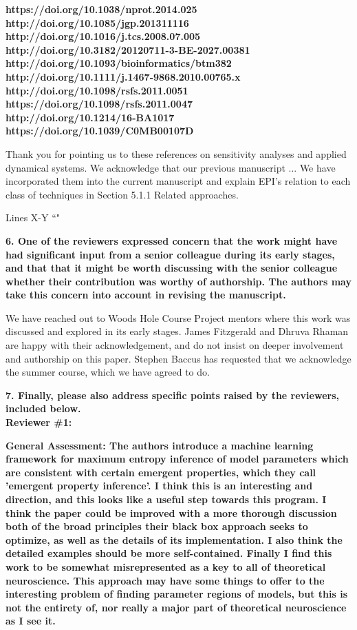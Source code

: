 \documentclass[11pt,a4paper]{article}
\begin{document}
\textbf{https://doi.org/10.1038/nprot.2014.025 \\
http://doi.org/10.1085/jgp.201311116 \\
http://doi.org/10.1016/j.tcs.2008.07.005 \\
http://doi.org/10.3182/20120711-3-BE-2027.00381 \\
http://doi.org/10.1093/bioinformatics/btm382 \\
http://doi.org/10.1111/j.1467-9868.2010.00765.x \\
http://doi.org/10.1098/rsfs.2011.0051 \\
https://doi.org/10.1098/rsfs.2011.0047 \\
http://doi.org/10.1214/16-BA1017 \\
https://doi.org/10.1039/C0MB00107D}

Thank you for pointing us to these references on sensitivity analyses and applied dynamical systems.  
We acknowledge that our previous manuscript ...
We have incorporated them into the current manuscript and explain EPI’s relation to each class of techniques in Section 5.1.1 Related approaches.

\begin{displayquote}
Lines X-Y
``"
\end{displayquote}

\textbf{6. One of the reviewers expressed concern that the work might have had significant input from a senior colleague during its early stages, and that that it might be worth discussing with the senior colleague whether their contribution was worthy of authorship. The authors may take this concern into account in revising the manuscript.}

We have reached out to Woods Hole Course Project mentors where this work was discussed and explored in its early stages.
James Fitzgerald and Dhruva Rhaman are happy with their acknowledgement, and do not insist on deeper involvement and authorship on this paper.
Stephen Baccus has requested that we acknowledge the summer course, which we have agreed to do.

\textbf{7. Finally, please also address specific points raised by the reviewers, included below. } \\

{\Large \textbf{Reviewer \#1: }}

\textbf{General Assessment: The authors introduce a machine learning framework for maximum entropy inference of model parameters which are consistent with certain emergent properties, which they call 'emergent property inference'. I think this is an interesting and direction, and this looks like a useful step towards this program. I think the paper could be improved with a more thorough discussion both of the broad principles their black box approach seeks to optimize, as well as the details of its implementation. I also think the detailed examples should be more self-contained. Finally I find this work to be somewhat misrepresented as a key to all of theoretical neuroscience. This approach may have some things to offer to the interesting problem of finding parameter regions of models, but this is not the entirety of, nor really a major part of theoretical neuroscience as I see it. }
\end{document}
